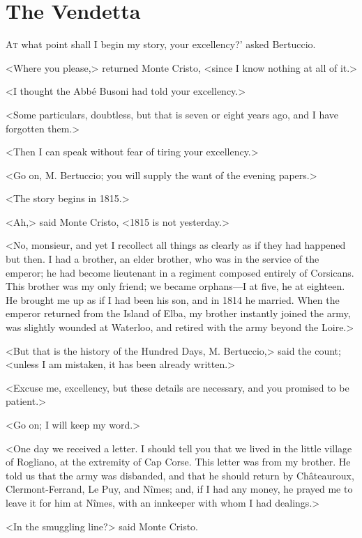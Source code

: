 \chapter{The Vendetta} 

 \lettrine[ante=']{A}{t} what point shall I begin my story, your excellency?' asked Bertuccio. 

\zz
 <Where you please,> returned Monte Cristo, <since I know nothing at all of it.> 

 <I thought the Abbé Busoni had told your excellency.> 

 <Some particulars, doubtless, but that is seven or eight years ago, and I have forgotten them.> 

 <Then I can speak without fear of tiring your excellency.> 

 <Go on, M. Bertuccio; you will supply the want of the evening papers.> 

 <The story begins in 1815.> 

 <Ah,> said Monte Cristo, <1815 is not yesterday.> 

 <No, monsieur, and yet I recollect all things as clearly as if they had happened but then. I had a brother, an elder brother, who was in the service of the emperor; he had become lieutenant in a regiment composed entirely of Corsicans. This brother was my only friend; we became orphans—I at five, he at eighteen. He brought me up as if I had been his son, and in 1814 he married. When the emperor returned from the Island of Elba, my brother instantly joined the army, was slightly wounded at Waterloo, and retired with the army beyond the Loire.> 

 <But that is the history of the Hundred Days, M. Bertuccio,> said the count; <unless I am mistaken, it has been already written.> 

 <Excuse me, excellency, but these details are necessary, and you promised to be patient.> 

 <Go on; I will keep my word.> 

 <One day we received a letter. I should tell you that we lived in the little village of Rogliano, at the extremity of Cap Corse. This letter was from my brother. He told us that the army was disbanded, and that he should return by Châteauroux, Clermont-Ferrand, Le Puy, and Nîmes; and, if I had any money, he prayed me to leave it for him at Nîmes, with an innkeeper with whom I had dealings.> 

 <In the smuggling line?> said Monte Cristo. 

